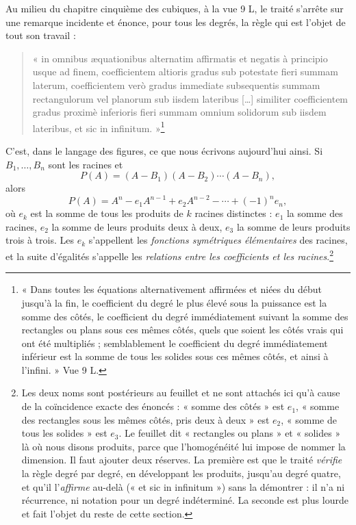 \documentclass[11pt,a4paper]{article}
\begin{document}
Au milieu du chapitre cinquième des cubiques, à la vue 9 L, le traité s'arrête
sur une remarque incidente et énonce, pour tous les degrés, la règle qui est
l'objet de tout son travail :

\begin{quote}
« in omnibus æquationibus alternatim affirmatis et negatis à principio usque ad
finem, coefficientem altioris gradus sub potestate fieri summam laterum,
coefficientem verò gradus immediate subsequentis summam rectangulorum vel
planorum sub iisdem lateribus […] similiter coefficientem gradus proximè
inferioris fieri summam omnium solidorum sub iisdem lateribus, et sic in
infinitum. »\footnote{« Dans toutes les équations alternativement affirmées et
niées du début jusqu'à la fin, le coefficient du degré le plus élevé sous la
puissance est la somme des côtés, le coefficient du degré immédiatement suivant
la somme des rectangles ou plans sous ces mêmes côtés, quels que soient les
côtés vrais qui ont été multipliés ; semblablement le coefficient du degré
immédiatement inférieur est la somme de tous les solides sous ces mêmes côtés,
et ainsi à l'infini. » Vue 9 L.}
\end{quote}

C'est, dans le langage des figures, ce que nous écrivons aujourd'hui ainsi. Si
$B_1, \dots, B_n$ sont les racines et
\[ P(A) = (A - B_1)(A - B_2)\cdots(A - B_n), \]
alors
\[ P(A) = A^n - e_1 A^{n-1} + e_2 A^{n-2} - \cdots + (-1)^n e_n, \]
où $e_k$ est la somme de tous les produits de $k$ racines distinctes : $e_1$ la
somme des racines, $e_2$ la somme de leurs produits deux à deux, $e_3$ la somme
de leurs produits trois à trois. Les $e_k$ s'appellent les \emph{fonctions
symétriques élémentaires} des racines, et la suite d'égalités s'appelle les
\emph{relations entre les coefficients et les racines}.\footnote{Les deux noms
sont postérieurs au feuillet et ne sont attachés ici qu'à cause de la
coïncidence exacte des énoncés : « somme des côtés » est $e_1$, « somme des
rectangles sous les mêmes côtés, pris deux à deux » est $e_2$, « somme de tous
les solides » est $e_3$. Le feuillet dit « rectangles ou plans » et « solides »
là où nous disons produits, parce que l'homogénéité lui impose de nommer la
dimension. Il faut ajouter deux réserves. La première est que le traité
\emph{vérifie} la règle degré par degré, en développant les produits, jusqu'au
degré quatre, et qu'il l'\emph{affirme} au-delà (« et sic in infinitum ») sans
la démontrer : il n'a ni récurrence, ni notation pour un degré indéterminé. La
seconde est plus lourde et fait l'objet du reste de cette section.}
\end{document}
